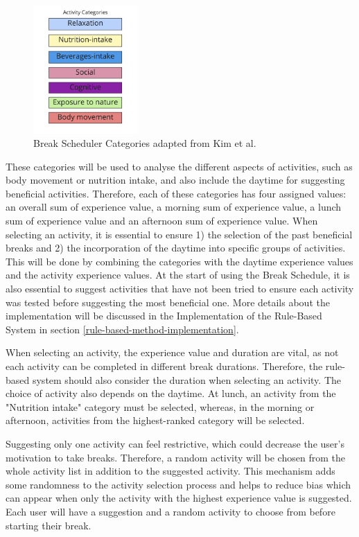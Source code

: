\documentclass{hasel_thesis}
\begin{document}
\begin{figure}[htp]
    \centering
    \includegraphics[width=4cm]{hasel_thesis/images/categories.png}
    \caption{Break Scheduler Categories adapted from Kim et al. \cite{KimS.ParkY.&Niu.2017} }
    \label{fig:categories}
\end{figure}



These categories will be used to analyse the different aspects of activities, such as body movement or nutrition intake, and also include the daytime for suggesting beneficial activities. Therefore, each of these categories has four assigned values: an overall sum of experience value, a morning sum of experience value, a lunch sum of experience value and an afternoon sum of experience value. When selecting an activity, it is essential to ensure 1) the selection of the past beneficial breaks and 2) the incorporation of the daytime into specific groups of activities. This will be done by combining the categories with the daytime experience values and the activity experience values. At the start of using the Break Schedule, it is also essential to suggest activities that have not been tried to ensure each activity was tested before suggesting the most beneficial one. More details about the implementation will be discussed in the Implementation of the Rule-Based System in section \ref{rule-based-method-implementation}.

When selecting an activity, the experience value and duration are vital, as not each activity can be completed in different break durations. Therefore, the rule-based system should also consider the duration when selecting an activity. The choice of activity also depends on the daytime. At lunch, an activity from the "Nutrition intake" category must be selected, whereas, in the morning or afternoon, activities from the highest-ranked category will be selected. 

Suggesting only one activity can feel restrictive, which could decrease the user's motivation to take breaks. Therefore, a random activity will be chosen from the whole activity list in addition to the suggested activity. This mechanism adds some randomness to the activity selection process and helps to reduce bias which can appear when only the activity with the highest experience value is suggested. Each user will have a suggestion and a random activity to choose from before starting their break. 
\end{document}
